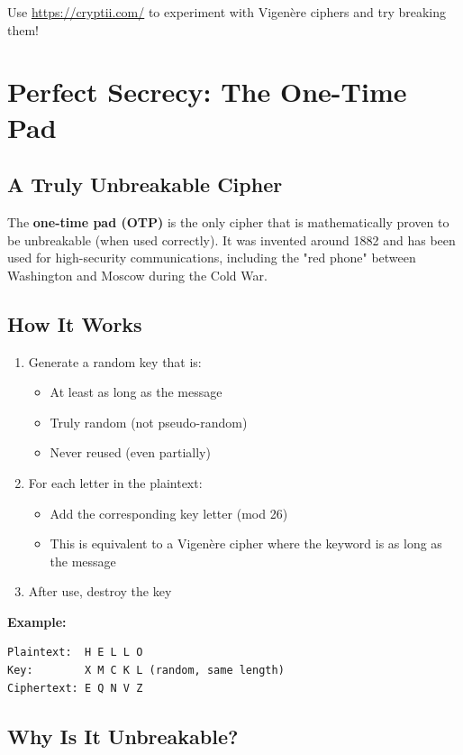 \documentclass[11pt,a4paper]{report}
\begin{document}
Use \url{https://cryptii.com/} to experiment with Vigenère ciphers and try breaking them!

\newpage
\section{Perfect Secrecy: The One-Time Pad}

\subsection{A Truly Unbreakable Cipher}

The \textbf{one-time pad (OTP)} is the only cipher that is mathematically proven to be unbreakable (when used correctly). It was invented around 1882 and has been used for high-security communications, including the "red phone" between Washington and Moscow during the Cold War.

\subsection{How It Works}

\begin{enumerate}
\item Generate a random key that is:
   \begin{itemize}
   \item At least as long as the message
   \item Truly random (not pseudo-random)
   \item Never reused (even partially)
   \end{itemize}

\item For each letter in the plaintext:
   \begin{itemize}
   \item Add the corresponding key letter (mod 26)
   \item This is equivalent to a Vigenère cipher where the keyword is as long as the message
   \end{itemize}

\item After use, destroy the key
\end{enumerate}

\textbf{Example:}
\begin{verbatim}
Plaintext:  H E L L O
Key:        X M C K L (random, same length)
Ciphertext: E Q N V Z
\end{verbatim}

\subsection{Why Is It Unbreakable?}
\end{document}
